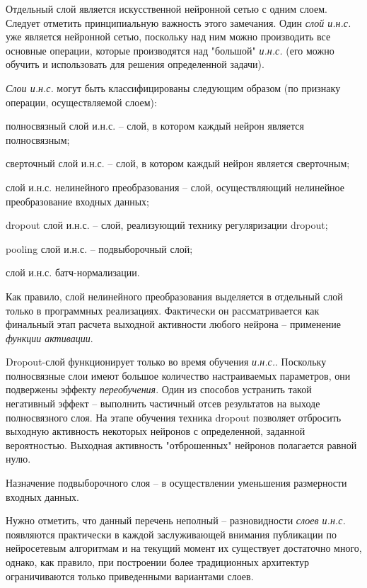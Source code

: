 Отдельный слой является искусственной нейронной сетью с одним слоем.
Следует отметить принципиальную важность этого замечания. Один \textit{слой и.н.с.}  уже является нейронной сетью, поскольку над ним можно производить все основные операции, которые производятся над "большой"{} \textit{и.н.с.} (его можно обучить и использовать для решения определенной задачи).

\textit{Слои и.н.с.} могут быть классифицированы следующим образом (по признаку операции, осуществляемой слоем):
\begin{textitemize}
	\item полносвязный слой и.н.с. -- слой, в котором каждый нейрон является полносвязным;
	\item сверточный слой и.н.с. -- слой, в котором каждый нейрон является сверточным;
	\item слой и.н.с. нелинейного преобразования -- слой, осуществляющий нелинейное преобразование входных данных;
	\item dropout слой и.н.с. -- слой, реализующий технику регуляризации dropout;
	\item pooling слой и.н.с. -- подвыборочный слой;
	\item слой и.н.с. батч-нормализации.
\end{textitemize}

Как правило, слой нелинейного преобразования выделяется в отдельный слой только в программных реализациях. Фактически он рассматривается как финальный этап расчета выходной активности любого нейрона -- применение \textit{функции активации}.

Dropout-слой функционирует только во время обучения \textit{и.н.с.}. Поскольку полносвязные слои имеют большое количество настраиваемых параметров, они подвержены эффекту \textit{переобучения}. Один из способов устранить такой негативный эффект -- выполнить частичный отсев результатов на выходе полносвязного слоя. На этапе обучения техника dropout позволяет отбросить выходную активность некоторых нейронов с определенной, заданной вероятностью. Выходная активность "отброшенных"{} нейронов полагается равной нулю.

Назначение подвыборочного слоя -- в осуществлении уменьшения размерности входных данных.

Нужно отметить, что данный перечень неполный -- разновидности \textit{слоев и.н.с.} появляются практически в каждой заслуживающей внимания публикации по нейросетевым алгоритмам и на текущий момент их существует достаточно много, однако, как правило, при построении более традиционных архитектур ограничиваются только приведенными вариантами слоев.

